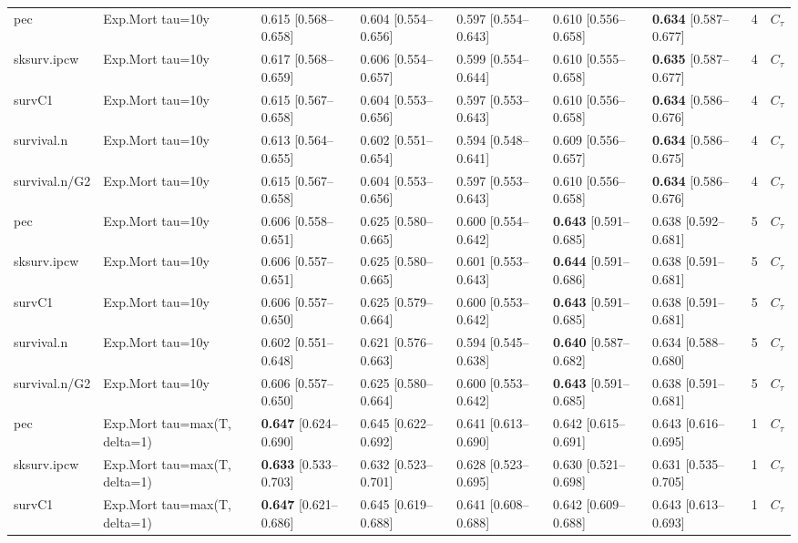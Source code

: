 \begin{tabular}{lllllllrl}
\addlinespace
pec & Exp.Mort tau=10y & 0.615 [0.568–0.658] & 0.604 [0.554–0.656] & 0.597 [0.554–0.643] & 0.610 [0.556–0.658] & \textbf{0.634} [0.587–0.677] & 4 & $C_{\tau}$\\
sksurv.ipcw & Exp.Mort tau=10y & 0.617 [0.568–0.659] & 0.606 [0.554–0.657] & 0.599 [0.554–0.644] & 0.610 [0.555–0.658] & \textbf{0.635} [0.587–0.677] & 4 & $C_{\tau}$\\
survC1 & Exp.Mort tau=10y & 0.615 [0.567–0.658] & 0.604 [0.553–0.656] & 0.597 [0.553–0.643] & 0.610 [0.556–0.658] & \textbf{0.634} [0.586–0.676] & 4 & $C_{\tau}$\\
survival.n & Exp.Mort tau=10y & 0.613 [0.564–0.655] & 0.602 [0.551–0.654] & 0.594 [0.548–0.641] & 0.609 [0.556–0.657] & \textbf{0.634} [0.586–0.675] & 4 & $C_{\tau}$\\
survival.n/G2 & Exp.Mort tau=10y & 0.615 [0.567–0.658] & 0.604 [0.553–0.656] & 0.597 [0.553–0.643] & 0.610 [0.556–0.658] & \textbf{0.634} [0.586–0.676] & 4 & $C_{\tau}$\\
\addlinespace
pec & Exp.Mort tau=10y & 0.606 [0.558–0.651] & 0.625 [0.580–0.665] & 0.600 [0.554–0.642] & \textbf{0.643} [0.591–0.685] & 0.638 [0.592–0.681] & 5 & $C_{\tau}$\\
sksurv.ipcw & Exp.Mort tau=10y & 0.606 [0.557–0.651] & 0.625 [0.580–0.665] & 0.601 [0.553–0.643] & \textbf{0.644} [0.591–0.686] & 0.638 [0.591–0.681] & 5 & $C_{\tau}$\\
survC1 & Exp.Mort tau=10y & 0.606 [0.557–0.650] & 0.625 [0.579–0.664] & 0.600 [0.553–0.642] & \textbf{0.643} [0.591–0.685] & 0.638 [0.591–0.681] & 5 & $C_{\tau}$\\
survival.n & Exp.Mort tau=10y & 0.602 [0.551–0.648] & 0.621 [0.576–0.663] & 0.594 [0.545–0.638] & \textbf{0.640} [0.587–0.682] & 0.634 [0.588–0.680] & 5 & $C_{\tau}$\\
survival.n/G2 & Exp.Mort tau=10y & 0.606 [0.557–0.650] & 0.625 [0.580–0.664] & 0.600 [0.553–0.642] & \textbf{0.643} [0.591–0.685] & 0.638 [0.591–0.681] & 5 & $C_{\tau}$\\
\addlinespace
pec & Exp.Mort tau=max(T, delta=1) & \textbf{0.647} [0.624–0.690] & 0.645 [0.622–0.692] & 0.641 [0.613–0.690] & 0.642 [0.615–0.691] & 0.643 [0.616–0.695] & 1 & $C_{\tau}$\\
sksurv.ipcw & Exp.Mort tau=max(T, delta=1) & \textbf{0.633} [0.533–0.703] & 0.632 [0.523–0.701] & 0.628 [0.523–0.695] & 0.630 [0.521–0.698] & 0.631 [0.535–0.705] & 1 & $C_{\tau}$\\
survC1 & Exp.Mort tau=max(T, delta=1) & \textbf{0.647} [0.621–0.686] & 0.645 [0.619–0.688] & 0.641 [0.608–0.688] & 0.642 [0.609–0.688] & 0.643 [0.613–0.693] & 1 & $C_{\tau}$\\

\end{tabular}
